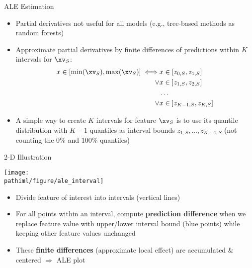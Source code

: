 \documentclass[11pt,compress,t,notes=noshow, aspectratio=169, xcolor=table]{beamer}
\newcommand{\pathiml}{../../slides/03_feature-effects/}
\begin{document}

\begin{frame}{ALE Estimation}

\begin{itemize}
  \item Partial derivatives not useful for all models (e.g., tree-based methods as random forests)
  \item Approximate partial derivatives by finite differences of predictions within $K$ intervals for $\xv_S$:
  $$
  \begin{aligned}
  x \in [\min(\xv_S), \max(\xv_S)] \iff &x \in [z_{0, S}, z_{1, S}] \\
  \lor &x \in \; ]z_{1, S}, z_{2, S}] \\
  &\dots \\
  \lor &x \in \; ]z_{K-1, S}, z_{K, S}]
  \end{aligned}
  $$
  \item A simple way to create $K$ intervals for feature $\xv_S$ is to use its quantile distribution with $K-1$ quantiles as interval bounds $z_{1,S}, \dots, z_{K-1,S}$ (not counting the 0\% and 100\% quantiles)
\end{itemize}

\end{frame}


\begin{frame}{2-D Illustration}

\centerline{\texttt{[image: \\pathiml/figure/ale\_interval]}}

\begin{itemize}
\item Divide feature of interest into intervals (vertical lines)
\item For all points within an interval, compute \textbf{prediction difference} when we replace feature value with upper/lower interval bound (blue points) while keeping other feature values unchanged
\item These \textbf{finite differences} (approximate local effect) are accumulated \& centered $\Rightarrow$ ALE plot %
\end{itemize}

\end{frame}
\end{document}
